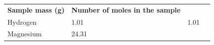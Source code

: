 \begin{enumerate}[noitemsep, label=\textbf{\arabic*}. ]
{\begin{tabular}[t]{|l|l|l|l|}
    
        \textbf{Sample mass (g)} &
    
    
        \textbf{Number of moles in the sample}%
     \tabularnewline\cline{1-1}\cline{2-2}\cline{3-3}\cline{4-4}
    
    
        Hydrogen &
    
    
        1.01 &
    
    
        1.01 &
    
    
     \tabularnewline\cline{1-1}\cline{2-2}\cline{3-3}\cline{4-4}
    
    
        Magnesium &
    
    
        24.31 &
    

\end{tabular}}
\end{enumerate}

